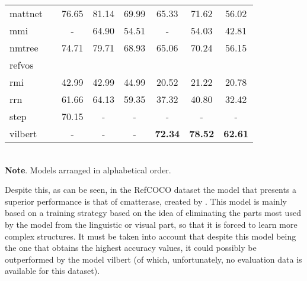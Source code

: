 \begin{table}[p]
\begin{tabular}{lc*6c}
    \acs{mattnet}    & \cite{yu18:mattn}                                            & 76.65          & 81.14          & 69.99          & 65.33          & 71.62          & 56.02          \\
    \acs{mmi}        & \cite{mao16:gener}                                           & -              & 64.90          & 54.51          & -              & 54.03          & 42.81          \\
    \acs{nmtree}     & \cite{liu19:learn_assem_neural_modul_tree}                   & 74.71          & 79.71          & 68.93          & 65.06          & 70.24          & 56.15          \\
    \acs{refvos}     & \cite{bellver20:refvos}                                      &                &                &                &                &                &                \\
    \acs{rmi}        & \cite{liu17:recur_multim_inter_refer_image_segmen}           & 42.99          & 42.99          & 44.99          & 20.52          & 21.22          & 20.78          \\
    \acs{rrn}        & \cite{li18:refer_image_segmen_recur_refin_networ}            & 61.66          & 64.13          & 59.35          & 37.32          & 40.80          & 32.42          \\
    \acs{step}       & \cite{chen19:see_throug_text_group_refer_image_segmen}       & 70.15          & -              & -              & -              & -              & -              \\
    \acs{vilbert}    & \cite{lu19:vilber}                                           & -              & -              & -              & \textbf{72.34} & \textbf{78.52} & \textbf{62.61} \\
    \bottomrule
  \end{tabular}\\[1.25ex]
  {\small\textbf{Note}. Models arranged in alphabetical order.}
\end{table}

Despite this, as can be seen, in the RefCOCO dataset the model that presents a
superior performance is that of \gls{cmatterase}, created by
. This model is
mainly based on a training strategy based on the idea of eliminating the parts
most used by the model from the linguistic or visual part, so that it is forced
to learn more complex structures. It must be taken into account that despite
this model being the one that obtains the highest accuracy values, it could
possibly be outperformed by the model \acs{vilbert} (of which, unfortunately,
no evaluation data is available for this dataset).

